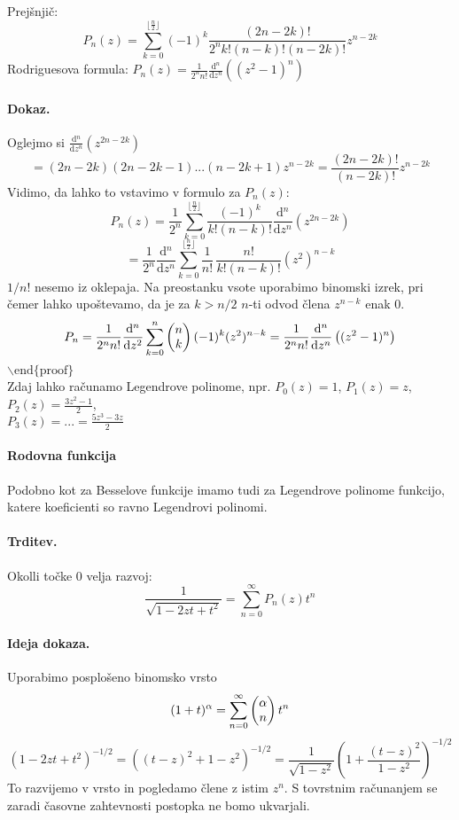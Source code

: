 \documentclass[a4paper]{article}
\newcommand{\dd}[2]{\frac{\mathrm{d} {#1}}{\mathrm{d} {#2}}}
\newcommand{\Sum}[2][0]{\sum_{{#2} = {#1}}^{\infty}}
\newcommand{\Binom}[2]{\begin{pmatrix} {#1} \cr {#2} \end{pmatrix}}
\begin{document}
Prejšnjič:
$$P_n(z) = \sum_{k=0}^{\lfloor\frac{n}{2}\rfloor}(-1)^k\frac{(2n-2k)!}{2^n k!(n-k)!(n-2k)!}z^{n-2k}$$
Rodriguesova formula: $\displaystyle{P_n(z) = \frac{1}{2^n n!}\dd{^n}{z^n}\left((z^2 - 1)^n\right)}$
\paragraph{Dokaz.} Oglejmo si $\displaystyle{\dd{^n}{z^n}\left(z^{2n - 2k}\right)}$
$$= (2n - 2k)(2n - 2k - 1)...(n-2k + 1)z^{n-2k} = \frac{(2n - 2k)!}{(n-2k)!}z^{n-2k}$$
Vidimo, da lahko to vstavimo v formulo za $P_n(z)$:
$$P_n(z) = \frac{1}{2^n}\sum_{k=0}^{\lfloor\frac{n}{2}\rfloor}\frac{(-1)^k}{k! (n-k)!}\dd{^n}{z^n}\left(z^{2n - 2k}\right)$$
$$= \frac{1}{2^n}\dd{^n}{z^n}\sum_{k=0}^{\lfloor\frac{n}{2}\rfloor} \frac{1}{n!}\,\frac{n!}{k!(n-k)!}(z^2)^{n-k}$$
$1/n!$ nesemo iz oklepaja. Na preostanku vsote uporabimo binomski izrek, pri čemer lahko upoštevamo, da je za $k > n/2$ $n$-ti odvod člena $z^{n-k}$ enak 0.
$$P_n = \frac{1}{2^n n!} \dd{^n}{z^2} \sum_{k=0}^{n} \Binom{n}{k} (-1)^k (z^2)^{n-k} = \frac{1}{2^n n!}\dd{^n}{z^n}\left((z^2 - 1)^n\right)$$
$\backslash\mathrm{end\{proof\}}$ \\[3mm]
Zdaj lahko računamo Legendrove polinome, npr. $P_0(z) = 1$, $P_1(z) = z$, $P_2(z) = \displaystyle{\frac{3z^2 - 1}{2}}$, \\ $P_3(z) = ... = \displaystyle{\frac{5z^3 - 3z}{2}}$
\paragraph{Rodovna funkcija} Podobno kot za Besselove funkcije imamo tudi za Legendrove polinome funkcijo, katere koeficienti so ravno Legendrovi polinomi.
\paragraph{Trditev.} Okolli točke 0 velja razvoj: $$\frac{1}{\sqrt{1 - 2zt + t^2}} = \Sum{n}P_n(z)t^n$$
\paragraph{Ideja dokaza.} Uporabimo posplošeno binomsko vrsto $$(1 + t)^\alpha = \Sum{n}\Binom{\alpha}{n}t^n$$
$$(1 - 2zt + t^2)^{-1/2} = \left((t-z)^2 + 1 - z^2\right)^{-1/2} = \frac{1}{\sqrt{1-z^2}}\left(1 + \frac{(t-z)^2}{1-z^2}\right)^{-1/2}$$
To razvijemo v vrsto in pogledamo člene z istim $z^n$. S tovrstnim računanjem se zaradi časovne zahtevnosti postopka ne bomo ukvarjali. \\
\end{document}
